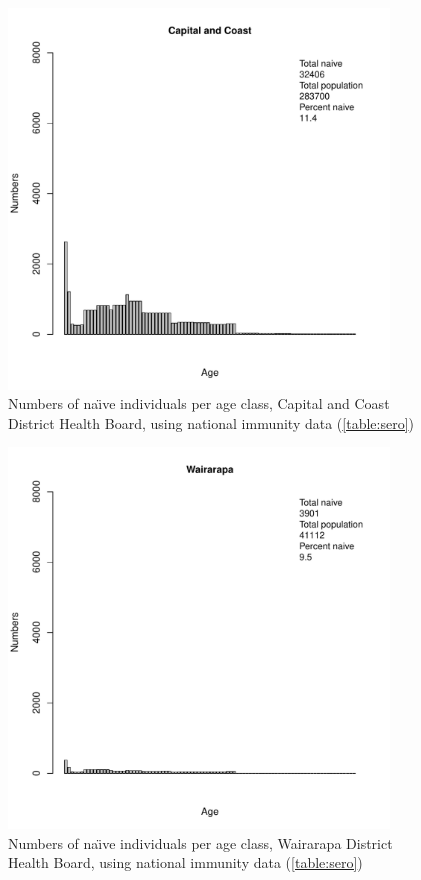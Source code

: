 \documentclass{article}
\begin{document}
\begin{figure}[H]
     \begin{center}
     \includegraphics[width=0.9\textwidth]{dhb14.pdf}
     \end{center}
     \caption{Numbers of na\"{\i}ve individuals per age class, Capital and Coast District Health Board, using national immunity data (\autoref{table:sero})}
     \label{fig:CapitalandCoast}
\end{figure}

\begin{figure}[H]
     \begin{center}
     \includegraphics[width=0.9\textwidth]{dhb15.pdf}
     \end{center}
     \caption{Numbers of na\"{\i}ve individuals per age class, Wairarapa District Health Board, using national immunity data (\autoref{table:sero})}
     \label{fig:Wairarapa}
\end{figure}
\end{document}
